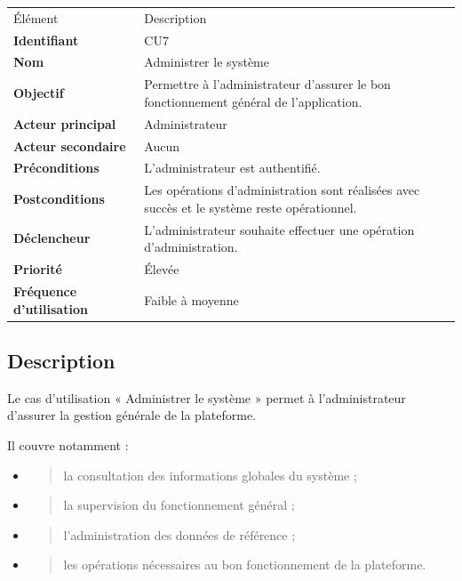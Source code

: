\documentclass[
]{book}
\begin{document}
\begin{longtable}[]{@{}ll@{}}
\toprule
\endhead
Élément & Description \\
\textbf{Identifiant} & CU7 \\
\textbf{Nom} & Administrer le système \\
\textbf{Objectif} & Permettre à l'administrateur d'assurer le bon
fonctionnement général de l'application. \\
\textbf{Acteur principal} & Administrateur \\
\textbf{Acteur secondaire} & Aucun \\
\textbf{Préconditions} & L'administrateur est authentifié. \\
\textbf{Postconditions} & Les opérations d'administration sont réalisées
avec succès et le système reste opérationnel. \\
\textbf{Déclencheur} & L'administrateur souhaite effectuer une opération
d'administration. \\
\textbf{Priorité} & Élevée \\
\textbf{Fréquence d'utilisation} & Faible à moyenne \\
\bottomrule
\end{longtable}

\hypertarget{description-5}{%
\subsection{Description}\label{description-5}}

Le cas d'utilisation « Administrer le système » permet à
l'administrateur d'assurer la gestion générale de la plateforme.

Il couvre notamment :

\begin{itemize}
\item
  \begin{quote}
  la consultation des informations globales du système ;
  \end{quote}
\item
  \begin{quote}
  la supervision du fonctionnement général ;
  \end{quote}
\item
  \begin{quote}
  l'administration des données de référence ;
  \end{quote}
\item
  \begin{quote}
  les opérations nécessaires au bon fonctionnement de la plateforme.
  \end{quote}
\end{itemize}
\end{document}
